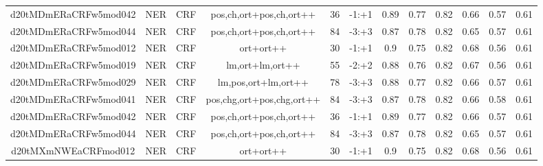 \documentclass[a4paper]{article}
\begin{document}
\begin{landscape}
\begin{center}
\begin{tabular}{ |c|c|c|c|c|c|c|c|c|c|c|c|}
 
 	
 	\small{ d20tMDmERaCRFw5mod042 } & \small{ NER} & \small{  CRF }  & pos,ch,ort+pos,ch,ort++  &  36 &  \small{  -1:+1 }  &  0.89 & 0.77 & 0.82  &  0.66 & 0.57 & 0.61 \\
 	

 
 	
 	\small{ d20tMDmERaCRFw5mod044 } & \small{ NER} & \small{  CRF }  & pos,ch,ort+pos,ch,ort++  &  84 &  \small{  -3:+3 }  &  0.87 & 0.78 & 0.82  &  0.65 & 0.57 & 0.61 \\
 	

 
 	
 	\small{ d20tMDmERaCRFw5mod012 } & \small{ NER} & \small{  CRF }  & ort+ort++  &  30 &  \small{  -1:+1 }  &  0.9 & 0.75 & 0.82  &  0.68 & 0.56 & 0.61 \\
 	

 
 	
 	\small{ d20tMDmERaCRFw5mod019 } & \small{ NER} & \small{  CRF }  & lm,ort+lm,ort++  &  55 &  \small{  -2:+2 }  &  0.88 & 0.76 & 0.82  &  0.67 & 0.56 & 0.61 \\
 	

 
 	
 	\small{ d20tMDmERaCRFw5mod029 } & \small{ NER} & \small{  CRF }  & lm,pos,ort+lm,ort++  &  78 &  \small{  -3:+3 }  &  0.88 & 0.77 & 0.82  &  0.66 & 0.57 & 0.61 \\
 	

 
 	
 	\small{ d20tMDmERaCRFw5mod041 } & \small{ NER} & \small{  CRF }  & pos,chg,ort+pos,chg,ort++  &  84 &  \small{  -3:+3 }  &  0.87 & 0.78 & 0.82  &  0.66 & 0.58 & 0.61 \\
 	

 
 	
 	\small{ d20tMDmERaCRFw5mod042 } & \small{ NER} & \small{  CRF }  & pos,ch,ort+pos,ch,ort++  &  36 &  \small{  -1:+1 }  &  0.89 & 0.77 & 0.82  &  0.66 & 0.57 & 0.61 \\
 	

 
 	
 	\small{ d20tMDmERaCRFw5mod044 } & \small{ NER} & \small{  CRF }  & pos,ch,ort+pos,ch,ort++  &  84 &  \small{  -3:+3 }  &  0.87 & 0.78 & 0.82  &  0.65 & 0.57 & 0.61 \\
 	

 
 	
 	\small{ d20tMXmNWEaCRFmod012 } & \small{ NER} & \small{  CRF }  & ort+ort++  &  30 &  \small{  -1:+1 }  &  0.9 & 0.75 & 0.82  &  0.68 & 0.56 & 0.61 \\
 	


\end{tabular}
\end{center}
\end{landscape}
\end{document}
